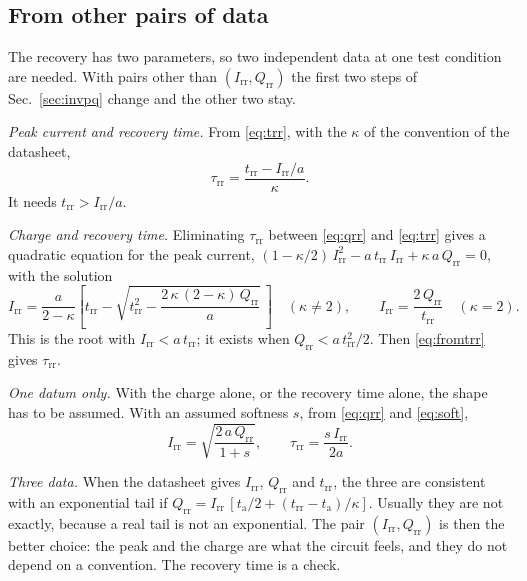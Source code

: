 \documentclass[10pt,a4paper]{scrartcl}
\newcommand{\Irr}{I_\mathrm{rr}}
\newcommand{\Qrr}{Q_\mathrm{rr}}
\newcommand{\trr}{t_\mathrm{rr}}
\newcommand{\ta}{t_\mathrm{a}}
\newcommand{\taurr}{\tau_\mathrm{rr}}
\begin{document}
\subsection{From other pairs of data}
\label{sec:pairs}
The recovery has two parameters, so two independent data at one test condition are needed. With pairs other than $(\Irr, \Qrr)$ the first two steps of Sec.~\ref{sec:invpq} change and the other two stay.

\emph{Peak current and recovery time.} From \eqref{eq:trr}, with the $\kappa$ of the convention of the datasheet,
\begin{equation}
\taurr = \frac{\trr - \Irr/a}{\kappa} .
\label{eq:fromtrr}
\end{equation}
It needs $\trr > \Irr/a$.

\emph{Charge and recovery time.} Eliminating $\taurr$ between \eqref{eq:qrr} and \eqref{eq:trr} gives a quadratic equation for the peak current, $(1-\kappa/2)\,\Irr^2 - a\,\trr\,\Irr + \kappa\,a\,\Qrr = 0$, with the solution
\begin{equation}
\Irr = \frac{a}{2-\kappa}\left[\trr - \sqrt{\trr^2 - \frac{2\,\kappa\,(2-\kappa)\,\Qrr}{a}}\,\right] \quad (\kappa \neq 2) , \qquad \Irr = \frac{2\,\Qrr}{\trr} \quad (\kappa = 2) .
\label{eq:fromqt}
\end{equation}
This is the root with $\Irr < a\,\trr$; it exists when $\Qrr < a\,\trr^2/2$. Then \eqref{eq:fromtrr} gives $\taurr$.

\emph{One datum only.} With the charge alone, or the recovery time alone, the shape has to be assumed. With an assumed softness $s$, from \eqref{eq:qrr} and \eqref{eq:soft},
\begin{equation}
\Irr = \sqrt{\frac{2\,a\,\Qrr}{1+s}} , \qquad \taurr = \frac{s\,\Irr}{2a} .
\label{eq:fromq}
\end{equation}

\emph{Three data.} When the datasheet gives $\Irr$, $\Qrr$ and $\trr$, the three are consistent with an exponential tail if $\Qrr = \Irr\,[\ta/2 + (\trr-\ta)/\kappa]$. Usually they are not exactly, because a real tail is not an exponential. The pair $(\Irr, \Qrr)$ is then the better choice: the peak and the charge are what the circuit feels, and they do not depend on a convention. The recovery time is a check.
\end{document}
